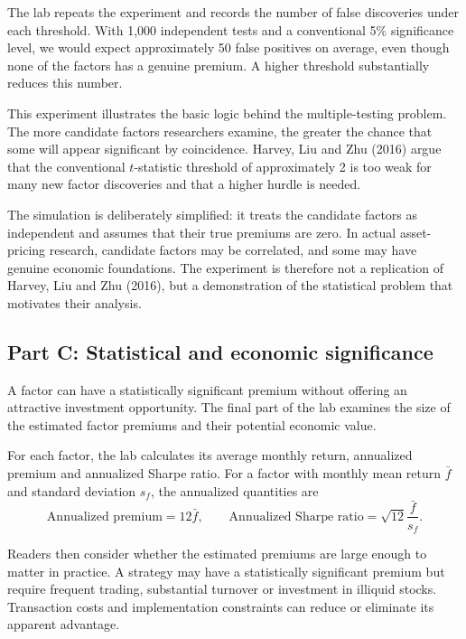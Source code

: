 The lab repeats the experiment and records the number of false discoveries under each threshold. With 1,000 independent tests and a conventional 5\% significance level, we would expect approximately 50 false positives on average, even though none of the factors has a genuine premium. A higher threshold substantially reduces this number.

This experiment illustrates the basic logic behind the multiple-testing problem. The more candidate factors researchers examine, the greater the chance that some will appear significant by coincidence. Harvey, Liu and Zhu (2016) argue that the conventional $t$-statistic threshold of approximately 2 is too weak for many new factor discoveries and that a higher hurdle is needed.

The simulation is deliberately simplified: it treats the candidate factors as independent and assumes that their true premiums are zero. In actual asset-pricing research, candidate factors may be correlated, and some may have genuine economic foundations. The experiment is therefore not a replication of Harvey, Liu and Zhu (2016), but a demonstration of the statistical problem that motivates their analysis.

\subsection*{Part C: Statistical and economic significance}

A factor can have a statistically significant premium without offering an attractive investment opportunity. The final part of the lab examines the size of the estimated factor premiums and their potential economic value.

For each factor, the lab calculates its average monthly return, annualized premium and annualized Sharpe ratio. For a factor with monthly mean return $\bar{f}$ and standard deviation $s_f$, the annualized quantities are
\begin{equation}
  \text{Annualized premium}=12\bar{f},
  \qquad
  \text{Annualized Sharpe ratio}
  =\sqrt{12}\frac{\bar{f}}{s_f}.
  \label{eq:04-lab-sharpe}
\end{equation}

Readers then consider whether the estimated premiums are large enough to matter in practice. A strategy may have a statistically significant premium but require frequent trading, substantial turnover or investment in illiquid stocks. Transaction costs and implementation constraints can reduce or eliminate its apparent advantage.

